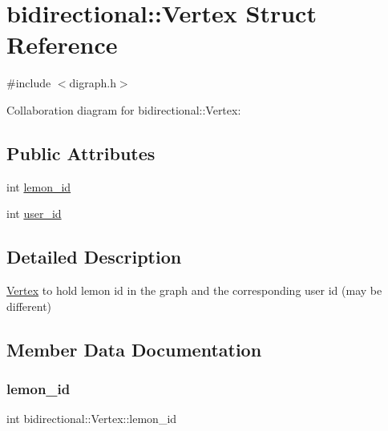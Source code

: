 \hypertarget{structbidirectional_1_1Vertex}{}\section{bidirectional\+:\+:Vertex Struct Reference}
\label{structbidirectional_1_1Vertex}


{\ttfamily \#include $<$digraph.\+h$>$}



Collaboration diagram for bidirectional\+:\+:Vertex\+:
\subsection*{Public Attributes}
\begin{DoxyCompactItemize}
\item 
int \hyperlink{structbidirectional_1_1Vertex_a93afb7643b7fb823dc2e337d233bef9e}{lemon\+\_\+id}
\item 
int \hyperlink{structbidirectional_1_1Vertex_a31a815c1052e67dbe13c7327b020aa0c}{user\+\_\+id}
\end{DoxyCompactItemize}


\subsection{Detailed Description}
\hyperlink{structbidirectional_1_1Vertex}{Vertex} to hold lemon id in the graph and the corresponding user id (may be different) 

\subsection{Member Data Documentation}
\mbox{\label{structbidirectional_1_1Vertex_a93afb7643b7fb823dc2e337d233bef9e}} 
\subsubsection{\texorpdfstring{lemon\+\_\+id}{lemon\_id}}
{\footnotesize\ttfamily int bidirectional\+::\+Vertex\+::lemon\+\_\+id}

\mbox{\label{structbidirectional_1_1Vertex_a31a815c1052e67dbe13c7327b020aa0c}} 
